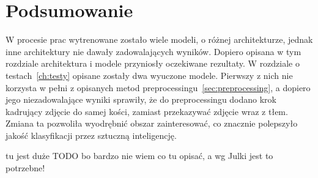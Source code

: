 \section{Podsumowanie}\label{sec:podsumowanie}

W procesie prac wytrenowane zostało wiele modeli, o różnej architekturze, jednak inne architektury nie dawały zadowalających wyników.
Dopiero opisana w tym rozdziale architektura i modele przyniosły oczekiwane rezultaty.
W rozdziale o testach~\ref{ch:testy} opisane zostały dwa wyuczone modele.
Pierwszy z nich nie korzysta w pełni z opisanych metod preprocessingu~\ref{sec:preprocessing}, a dopiero jego niezadowalające wyniki sprawiły, że do preprocessingu dodano krok kadrujący zdjęcie do samej kości, zamiast przekazywać zdjęcie wraz z tłem.
Zmiana ta pozwoliła wyodrębnić obszar zainteresować, co znacznie polepszyło jakość klasyfikacji przez sztuczną inteligencję.

tu jest duże TODO bo bardzo nie wiem co tu opisać, a wg Julki jest to potrzebne!
